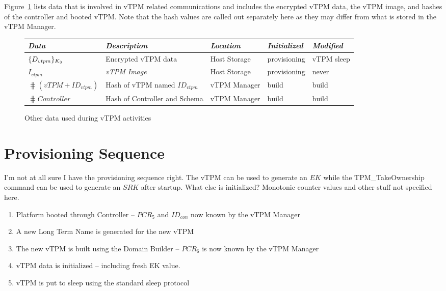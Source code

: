 \documentclass[10pt]{article}
\begin{document}
Figure~\ref{fig:other-data} lists data that is involved in vTPM
related communications and includes the encrypted vTPM data, the vTPM
image, and hashes of the controller and booted vTPM.  Note that the
hash values are called out separately here as they may differ from
what is stored in the vTPM Manager.

\begin{figure}[hbtp]
  \centering
  \begin{tabular}{lllll}
    \emph{Data} & \emph{Description} & \emph{Location} &
    \emph{Initialized} & \emph{Modified} \\ \hline
    $\{D_{vtpm}\}_{K_{3}}$ & Encrypted vTPM data & Host Storage &
    provisioning & vTPM sleep \\
    $I_{vtpm}$ & \emph{vTPM Image} & Host Storage & provisioning & never
    \\
    $\hash{(vTPM+ID_{vtpm})}$ & Hash of vTPM named $ID_{vtpm}$ & vTPM
    Manager & build & build \\ 
    $\hash{Controller}$ & Hash of Controller and Schema & vTPM
    Manager & build & build \\ 
  \end{tabular}
  \caption{Other data used during vTPM activities}
  \label{fig:other-data}
\end{figure}

\section{Provisioning Sequence}

I'm not at all sure I have the provisioning sequence right.  The vTPM
can be used to generate an $EK$ while the \textsf{TPM\_TakeOwnership}
command can be used to generate an $SRK$ after startup.  What else is
initialized?  Monotonic counter values and other stuff not specified here.

\begin{enumerate}
\item Platform booted through Controller -- $PCR_5$ and $ID_{con}$ now known by
  the vTPM Manager
\item A new Long Term Name is generated for the new vTPM
\item The new vTPM is built using the Domain Builder -- $PCR_6$ is now
  known by the vTPM Manager
\item vTPM data is initialized -- including fresh EK value.
\item vTPM is put to sleep using the standard sleep protocol
\end{enumerate}
\end{document}

